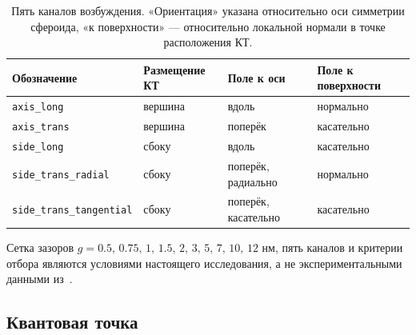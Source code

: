 \begin{table}[t]
  \centering
  \caption{Пять каналов возбуждения. «Ориентация» указана относительно оси
  симметрии сфероида, «к поверхности» — относительно локальной нормали в точке
  расположения КТ.}
  \label{tab:channels}
  \small
  \begin{tabular}{llll}
    \toprule
    Обозначение & Размещение КТ & Поле к оси & Поле к поверхности \\
    \midrule
    \texttt{axis\_long}              & вершина & вдоль   & нормально \\
    \texttt{axis\_trans}             & вершина & поперёк & касательно \\
    \texttt{side\_long}              & сбоку   & вдоль   & касательно \\
    \texttt{side\_trans\_radial}     & сбоку   & поперёк, радиально  & нормально \\
    \texttt{side\_trans\_tangential} & сбоку   & поперёк, касательно & касательно \\
    \bottomrule
  \end{tabular}
\end{table}

Сетка зазоров $g=0.5,\,0.75,\,1,\,1.5,\,2,\,3,\,5,\,7,\,10,\,12$ нм,
пять каналов и критерии отбора являются условиями настоящего исследования,
а не экспериментальными данными из~\cite{shah2013}.

\subsection{Квантовая точка}
\label{sec:qd}

